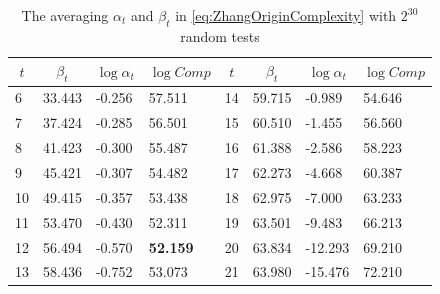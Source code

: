 \begin{table}[htbp]
  \centering
  \caption{The averaging $\alpha_t$ and $\beta_t$ in \eqref{eq:ZhangOriginComplexity} with $2^{30}$ random tests}\label{tab:ZhangAlphaAndBetaOriginal}
    \begin{tabular}{|l|l|l|l|l|l|l|l|}
    \hline
    \multicolumn{1}{|c|}{$t$} & \multicolumn{1}{c|}{$\beta_t$} & \multicolumn{1}{c|}{$\log\alpha_t$} & \multicolumn{1}{c|}{$\log Comp$} & \multicolumn{1}{c|}{$t$} & \multicolumn{1}{c|}{$\beta_t$} & \multicolumn{1}{c|}{$\log\alpha_t$} & \multicolumn{1}{c|}{$\log Comp$} \\
    \hline

    6    & 33.443 & -0.256 & 57.511 & 14    & 59.715 & -0.989 &  54.646\\
    \hline
    7    & 37.424 & -0.285 & 56.501 & 15    & 60.510 & -1.455 &  56.560\\
    \hline
    8    & 41.423 & -0.300 & 55.487 & 16    & 61.388 & -2.586 &  58.223\\
    \hline
    9    & 45.421  & -0.307 & 54.482 & 17    & 62.273 & -4.668 &  60.387\\
    \hline
    10   & 49.415 & -0.357  & 53.438 & 18    & 62.975 & -7.000 &  63.233\\
    \hline
    11    & 53.470 & -0.430 & 52.311 & 19    & 63.501 & -9.483 &  66.213\\
    \hline
    12    & 56.494 & -0.570 & \textbf{52.159} & 20    & 63.834 & -12.293 &  69.210\\
    \hline
    13    & 58.436 & -0.752 & 53.073 & 21    & 63.980 & -15.476 &  72.210\\
    \hline
    \end{tabular}%
\end{table}%



